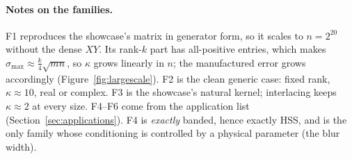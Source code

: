\paragraph{Notes on the families.}
F1 reproduces the showcase's matrix in generator form, so it scales to $n=2^{20}$ without the dense
$XY$. Its rank-$k$ part has all-positive entries, which makes $\sigma_{\max}\approx\frac k4\sqrt{mn}$, so
$\kappa$ grows linearly in $n$; the manufactured error grows accordingly (Figure~\ref{fig:largescale}).
F2 is the clean generic case: fixed rank, $\kappa\approx10$, real or complex. F3 is the showcase's
natural kernel; interlacing keeps $\kappa\approx2$ at every size. F4--F6 come from the application
list (Section~\ref{sec:applications}). F4 is \emph{exactly} banded, hence exactly HSS, and is the
only family whose conditioning is controlled by a physical parameter (the blur width).
